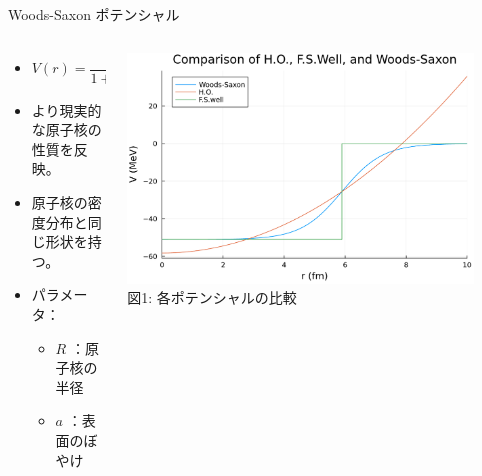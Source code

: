 \documentclass[aspectratio=169, 12pt, dvipdfmx]{beamer}
\begin{document}
\begin{frame}{Woods-Saxon ポテンシャル}
  \begin{columns}[totalwidth=1.0\linewidth]
    \begin{column}[t]{0.45\linewidth}
      \begin{itemize}
        \item $V(r)=\dfrac{V_0(< 0)}{1+\exp((r-R)/a)}$
        \item より現実的な原子核の性質を反映。
        \item 原子核の密度分布と同じ形状を持つ。
        \item パラメータ：
          \begin{itemize}
            \item \( R \) ：原子核の半径
            \item \( a \) ：表面のぼやけ
          \end{itemize}
      \end{itemize}
    \end{column}

    \begin{column}[T]{0.55\linewidth}
      \centering
      \includegraphics[width=0.9\textwidth]{fig_pdf/Comp_pt.pdf}
      \vspace{5pt}
      \scriptsize \\図1: 各ポテンシャルの比較
    \end{column}
  \end{columns}
\end{frame}
\end{document}
